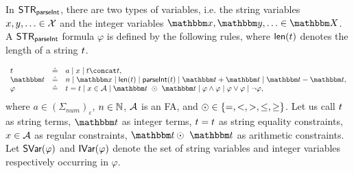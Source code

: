 In ${\sf STR}_{\textsf{parseInt}}$, there are two types of variables, i.e. the string variables $x,y,\ldots \in \mathcal{X}$ and the integer variables $\ivarx,\ivary,\ldots \in \ivars$.
%
A ${\sf STR}_{\textsf{parseInt}}$ formula $\varphi$ is defined by the following rules, where $\textsf{len}(t)$ denotes the length of a string $t$.

\[
\begin{array}{l c l}
\sterm & \Def & a \mid \svarx \mid \sterm \concat \sterm, \\
\iterm & \Def & n \mid \ivarx \mid \len(\sterm) \mid \parseInt(\sterm) \mid \iterm + \iterm \mid \iterm - \iterm,\\
\varphi & \Def & \sterm = \sterm \mid x \in \Aut \mid \iterm\ \op\ \iterm \mid \varphi \wedge \varphi \mid \varphi \vee \varphi \mid \neg \varphi,
\end{array}
\]
where $a \in (\Sigma_{\textit{num}})_\varepsilon$, $n \in \mathbb{N}$, $\mathcal{A}$ is an FA, and $\odot \in \{=, < , >, \le, \ge\}$. Let us call $t$ as string terms, $\iterm$ as integer terms, $t = t$ as string equality constraints, $x \in \mathcal{A}$ as regular constraints, $\iterm \op\ \iterm$ as arithmetic constraints. 
Let  $\textsf{SVar}(\varphi)$ and $\textsf{IVar}(\varphi)$ denote the set of string variables and integer variables respectively occurring in $\varphi$.


